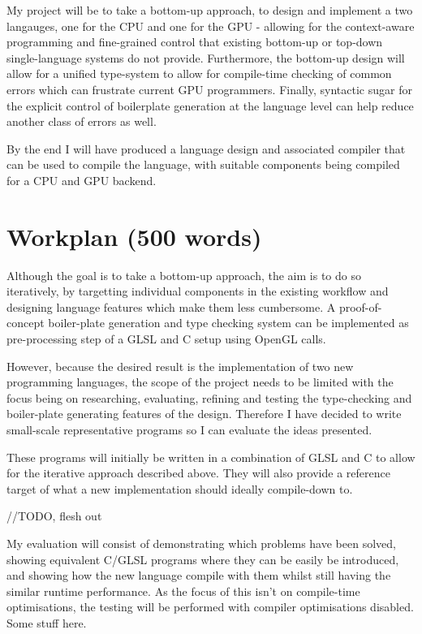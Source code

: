 \documentclass[11pt]{article}
\begin{document}
My project will be to take a bottom-up approach, to design and implement a two
langauges, one for the CPU and one for the GPU - allowing for the context-aware
programming and fine-grained control that existing bottom-up or top-down
single-language systems do not provide. Furthermore, the bottom-up design will
allow for a unified type-system to allow for compile-time checking of common
errors which can frustrate current GPU programmers. Finally, syntactic sugar
for the explicit control of boilerplate generation at the language level can
help reduce another class of errors as well.

By the end I will have produced a language design and associated compiler that
can be used to compile the language, with suitable components being compiled
for a CPU and GPU backend.

\section{Workplan (500 words)}

Although the goal is to take a bottom-up approach, the aim is to do so
iteratively, by targetting individual components in the existing workflow and
designing language features which make them less cumbersome. A proof-of-concept
boiler-plate generation and type checking system can be implemented as
pre-processing step of a GLSL and C setup using OpenGL calls.

However, because the desired result is the implementation of two new
programming languages, the scope of the project needs to be limited with the
focus being on researching, evaluating, refining and testing the type-checking
and boiler-plate generating features of the design. Therefore I have decided to
write small-scale representative programs so I can evaluate the ideas
presented.

These programs will initially be written in a combination of GLSL and C to
allow for the iterative approach described above. They will also provide a
reference target of what a new implementation should ideally compile-down to.

//TODO, flesh out

My evaluation will consist of demonstrating which problems have been solved,
showing equivalent C/GLSL programs where they can be easily be introduced, and showing
how the new language  compile with them whilst still having the
similar runtime performance. As the focus of this isn't on compile-time
optimisations, the testing will be performed with compiler optimisations
disabled.
Some stuff here.
\end{document}
